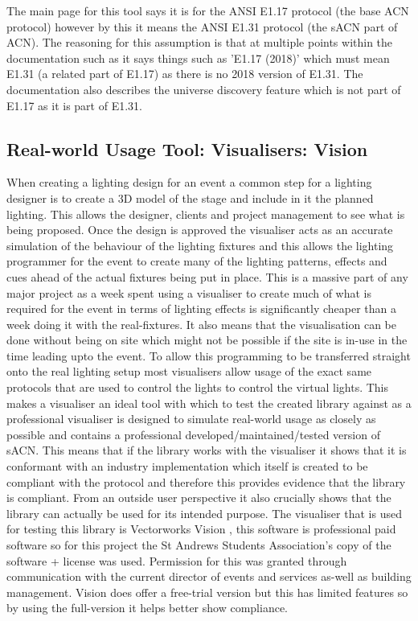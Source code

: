 \documentclass[11pt,a4paper]{article}
\begin{document}
The main page for this tool says it is for the ANSI E1.17 \cite{ANSI_E1.17} protocol (the base ACN protocol) however by this it means the ANSI E1.31 protocol (the sACN part of ACN). The reasoning for this assumption is that at multiple points within the documentation such as \cite{SACN_VIEWER_DOC} it says things such as 'E1.17 (2018)' which must mean E1.31 (a related part of E1.17) as there is no 2018 version of E1.31. The documentation also describes the universe discovery feature which is not part of E1.17 as it is part of E1.31.

\subsection{Real-world Usage Tool: Visualisers: Vision}
When creating a lighting design for an event a common step for a lighting designer is to create a 3D model of the stage and include in it the planned lighting. This allows the designer, clients and project management to see what is being proposed. Once the design is approved the visualiser acts as an accurate simulation of the behaviour of the lighting fixtures and this allows the lighting programmer for the event to create many of the lighting patterns, effects and cues ahead of the actual fixtures being put in place. This is a massive part of any major project as a week spent using a visualiser to create much of what is required for the event in terms of lighting effects is significantly cheaper than a week doing it with the real-fixtures. It also means that the visualisation can be done without being on site which might not be possible if the site is in-use in the time leading upto the event. To allow this programming to be transferred straight onto the real lighting setup most visualisers allow usage of the exact same protocols that are used to control the lights to control the virtual lights. This makes a visualiser an ideal tool with which to test the created library against as a professional visualiser is designed to simulate real-world usage as closely as possible and contains a professional developed/maintained/tested version of sACN. This means that if the library works with the visualiser it shows that it is conformant with an industry implementation which itself is created to be compliant with the protocol and therefore this provides evidence that the library is compliant. From an outside user perspective it also crucially shows that the library can actually be used for its intended purpose. The visualiser that is used for testing this library is Vectorworks Vision \cite{VISION}, this software is professional paid software so for this project the St Andrews Students Association's copy of the software + license was used. Permission for this was granted through communication with the current director of events and services as-well as building management. Vision does offer a free-trial version but this has limited features so by using the full-version it helps better show compliance. \\
\end{document}
